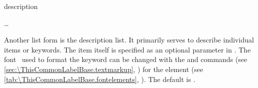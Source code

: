   \begin{Declaration}
    \begin{Environment}{description}
      \begin{Body}
         \dots
        \BodyDots
      \end{Body}
    \end{Environment}
  \end{Declaration}%
  Another list
  form is the description list. It primarily serves
  to describe individual items or keywords. The item itself is specified as an
  optional parameter in . %
  The font%
  \ used to format the keyword can be changed with the
   and
   commands (see
  \autoref{sec:\ThisCommonLabelBase.textmarkup},
  ) for the 
  element (see \autoref{tab:\ThisCommonLabelBase.fontelements},
  ). The default is
  \linebreak[1].%
